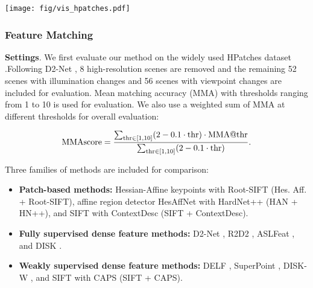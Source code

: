 \documentclass[10pt,twocolumn,letterpaper]{article}
\begin{document}
\begin{figure*}[!t]
    \centering
    \texttt{[image: fig/vis\_hpatches.pdf]}
    \caption{Visualization results achieved on HPatches. For simplicity,  only successfully matched keypoints are shown and colored according to their match errors. The colorbar is shown on the right. Best viewed in color.}
    \label{fig_vishpatches}
\end{figure*}

\subsubsection{Feature Matching}
\textbf{Settings}. We first evaluate our method on the widely used HPatches dataset \cite{hpatches_2017_cvpr}.Following D2-Net \cite{Dusmanu2019CVPR}, 8 high-resolution scenes are removed and the remaining 52 scenes with illumination changes and 56 scenes with viewpoint changes are included for evaluation. Mean matching accuracy (MMA) \cite{Dusmanu2019CVPR} with thresholds ranging from 1 to 10 is used for evaluation. 
We also use a weighted sum of MMA at different thresholds for overall evaluation:

\begin{equation}
\label{eq_mmascore}
    {\rm MMAscore} =  \frac{\sum_{{\rm thr}\in [1,10]}(2-0.1\cdot {\rm thr})\cdot {\rm MMA@thr}}{\sum_{{\rm thr}\in [1,10]}(2-0.1\cdot {\rm thr})}.
\end{equation}


{Three families of methods are included for comparison:}
\begin{itemize}
    \item \textbf{{Patch-based methods:}} Hessian-Affine keypoints \cite{mikolajczyk2004scale} with Root-SIFT \cite{arandjelovic2012three} (Hes. Aff. + Root-SIFT), affine region detector HesAffNet \cite{mishkin2018repeatability} with HardNet++ \cite{NIPS2017_831caa1b} (HAN + HN++), and SIFT \cite{lowe2004distinctive} with ContextDesc \cite{luo2019contextdesc} (SIFT + ContextDesc).

    \item { \textbf{Fully supervised dense feature methods:}} D2-Net \cite{Dusmanu2019CVPR}, R2D2 \cite{revaud2019r2d2}, ASLFeat \cite{luo2020aslfeat}, and DISK \cite{tyszkiewiczDISKLearningLocal2020a}. 

    \item { \textbf{Weakly supervised dense feature methods:}} DELF \cite{noh2017large}, SuperPoint \cite{detone2018superpoint}, DISK-W \cite{tyszkiewiczDISKLearningLocal2020a}, 
    and SIFT with CAPS \cite{wangLearningFeatureDescriptors2020} (SIFT + CAPS).
\end{itemize}
\end{document}
